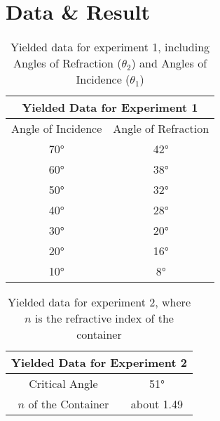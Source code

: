 \documentclass{elegantpaper}
\begin{document}
\section{Data \& Result}
\begin{table}[!ht]\footnotesize
	\centering
    \begin{tabular}{c|c}
        \multicolumn{2}{c}{\textbf{Yielded Data for Experiment 1}}\\ \hline
        Angle of Incidence & Angle of Refraction \\ \hline
        \ang{70}&\ang{42}\\
        \ang{60}&\ang{38}\\
        \ang{50}&\ang{32}\\
        \ang{40}&\ang{28}\\
        \ang{30}&\ang{20}\\
        \ang{20}&\ang{16}\\
        \ang{10}&\ang{8}\\
        \hline          
        \end{tabular}

  \caption{Yielded data for experiment 1, including Angles of Refraction ($\theta_2$) and Angles of Incidence ($\theta_1$)}
	\label{table: index of refraction}
\end{table}

\begin{table}[!ht]\footnotesize
	\centering
    \begin{tabular}{c|c}
        \multicolumn{2}{c}{\textbf{Yielded Data for Experiment 2}}\\ \hline
        Critical Angle & \ang{51} \\ \hline
        $n$ of the Container & about 1.49 \\ \hline
        \end{tabular}

  \caption{Yielded data for experiment 2, where $n$ is the refractive index of the container}
	\label{table: experiment 2}
\end{table}
\end{document}
